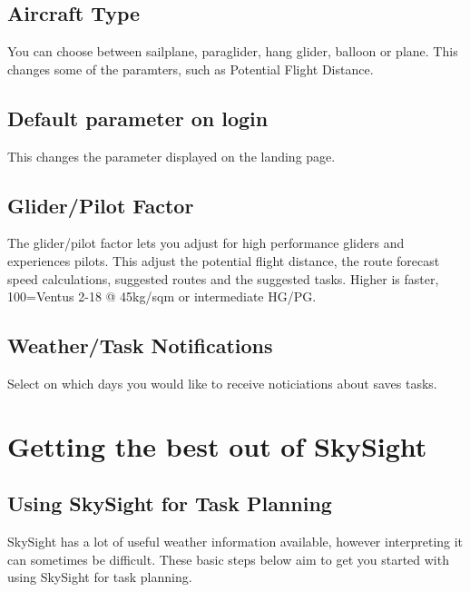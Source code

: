 \documentclass[11pt,a4paper]{article}
\begin{document}
\subsection{Aircraft Type}\label{subsec:aircraft_type}
You can choose between sailplane, paraglider, hang glider, balloon or plane. This changes some of the paramters, such as Potential Flight Distance.

\subsection{Default parameter on login}
This changes the parameter displayed on the landing page.

\subsection{Glider/Pilot Factor}\label{subsec:factor}
The glider/pilot factor lets you adjust for high performance gliders and experiences pilots. This adjust the potential flight distance, the route forecast speed calculations, suggested routes and the suggested tasks. Higher is faster, 100=Ventus 2-18 @ 45kg/sqm or intermediate HG/PG.

\subsection{Weather/Task Notifications}
Select on which days you would like to receive noticiations about saves tasks.

\section{Getting the best out of SkySight}
\subsection{Using SkySight for Task Planning}\label{subsec:taskplan}
SkySight has a lot of useful weather information available, however interpreting it can sometimes be difficult. These basic steps below aim to get you started with using SkySight for task planning.
\end{document}
